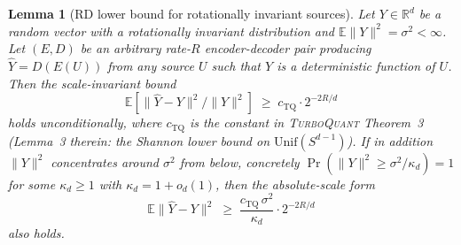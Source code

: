\documentclass{article}
\newtheorem{lemma}[theorem]{Lemma}
\theoremstyle{remark}
\newcommand{\R}{\mathbb{R}}
\newcommand{\E}{\mathbb{E}}
\begin{document}
\begin{lemma}[RD lower bound for rotationally invariant sources]
\label{lem:rd-rot}
Let $Y \in \R^d$ be a random vector with a rotationally invariant
distribution and $\E\|Y\|^2 = \sigma^2 < \infty$. Let $(E, D)$ be an
arbitrary rate-$R$ encoder-decoder pair producing $\hat Y = D(E(U))$
from any source $U$ such that $Y$ is a deterministic function of $U$.
Then the \emph{scale-invariant} bound
\begin{equation}\label{eq:rd-rot-scale}
  \E\!\left[\|\hat Y - Y\|^2 / \|Y\|^2\right]
  \;\geq\; c_{\mathrm{TQ}} \cdot 2^{-2R/d}
\end{equation}
holds unconditionally, where $c_{\mathrm{TQ}}$ is the constant in
\textsc{TurboQuant} Theorem~3 (Lemma~3 therein: the Shannon lower
bound on $\mathrm{Unif}(S^{d-1})$). If in addition $\|Y\|^2$
concentrates around $\sigma^2$ \emph{from below}, concretely
$\Pr(\|Y\|^2 \geq \sigma^2 / \kappa_d) = 1$ for some $\kappa_d \geq 1$
with $\kappa_d = 1 + o_d(1)$, then the absolute-scale form
\begin{equation}\label{eq:rd-rot}
  \E\|\hat Y - Y\|^2 \;\geq\; \frac{c_{\mathrm{TQ}}\,\sigma^2}{\kappa_d}
  \cdot 2^{-2R/d}
\end{equation}
also holds.
\end{lemma}
\end{document}
